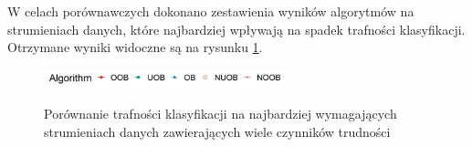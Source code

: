 \noindent W celach porównawczych dokonano zestawienia wyników algorytmów na strumieniach danych, które najbardziej wpływają na spadek trafności klasyfikacji. Otrzymane wyniki widoczne są na rysunku \ref{Figure:ComplexComparison}.

\begin{figure}[h]
    \centering
    \includegraphics[width=7cm]{figures/algorithms_legend.JPG}
\end{figure}

\vspace{-1.2cm}

\begin{figure}[h]
    \centering
    \qquad
    \caption{Porównanie trafności klasyfikacji na najbardziej wymagających strumieniach danych zawierających wiele czynników trudności}\label{Figure:ComplexComparison}
\end{figure}

